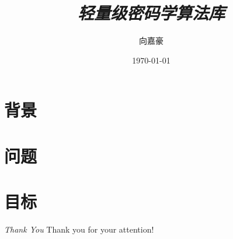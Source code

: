 \documentclass{beamer}
\title{\textit{轻量级密码学算法库}}
\author[xjh]{向嘉豪\inst{1}}
\institute{
    \inst{1}
    衡阳师范学院
}
\date{\today}
\begin{document}
\begin{frame}
    \titlepage
\end{frame}




\section{背景}



\section{问题}

\section{目标}



\begin{frame}{\textit{Thank You}}
    \centering
    \Large
    Thank you for your attention! \\
\end{frame}
\end{document}
